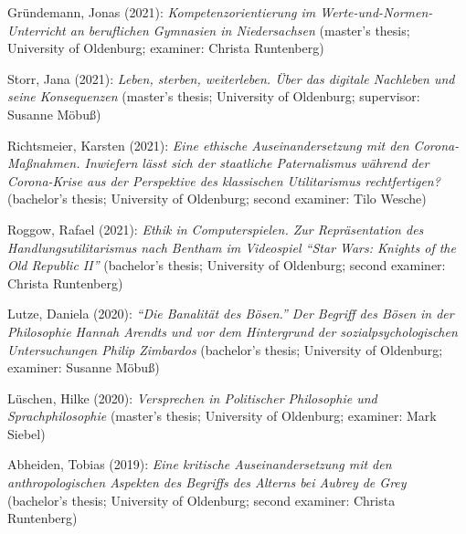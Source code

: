 \documentclass[a4paper,10pt]{article}
\newenvironment{literature}{%
   \parskip6pt\parindent0pt\raggedright
   \def\lititem{\hangindent=1cm\hangafter1}}{%
   \par\ignorespaces}
\begin{document}
\begin{literature}
\lititem Gründemann, Jonas (2021): \textit{Kompetenzorientierung im Werte-und-Normen-Unterricht an beruflichen Gymnasien in Niedersachsen} (master's thesis; University of Oldenburg; examiner: Christa Runtenberg)

\lititem Storr, Jana (2021): \textit{Leben, sterben, weiterleben. Über das digitale Nachleben und seine Konsequenzen} (master's thesis; University of Oldenburg; supervisor: Susanne Möbuß)

\lititem Richtsmeier, Karsten (2021): \textit{Eine ethische Auseinandersetzung mit den Corona-Maßnahmen. Inwiefern lässt sich der staatliche Paternalismus während der Corona-Krise aus der Perspektive des klassischen Utilitarismus rechtfertigen?} (bachelor's thesis; University of Oldenburg; second examiner: Tilo Wesche)

\lititem Roggow, Rafael (2021): \textit{Ethik in Computerspielen. Zur Repräsentation des Handlungsutilitarismus nach Bentham im Videospiel \enquote{Star Wars: Knights of the Old Republic II}} (bachelor's thesis; University of Oldenburg; second examiner: Christa Runtenberg)

\lititem Lutze, Daniela (2020): \textit{\enquote{Die Banalität des Bösen.} Der Begriff des Bösen in der Philosophie Hannah Arendts und vor dem Hintergrund der sozialpsychologischen Untersuchungen Philip Zimbardos} (bachelor's thesis; University of Oldenburg; examiner: Susanne Möbuß)

\lititem Lüschen, Hilke (2020): \textit{Versprechen in Politischer Philosophie und Sprachphilosophie} (master's thesis; University of Oldenburg; examiner: Mark Siebel)

\lititem Abheiden, Tobias (2019): \textit{Eine kritische Auseinandersetzung mit den anthropologischen Aspekten des Begriffs des Alterns bei Aubrey de Grey} (bachelor's thesis; University of Oldenburg; second examiner: Christa Runtenberg)
\end{literature}


\clearpage
\end{document}

